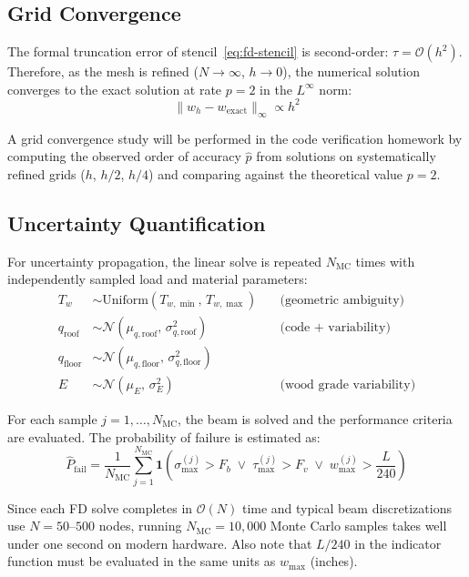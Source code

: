 \subsection{Grid Convergence}

The formal truncation error of stencil~\eqref{eq:fd-stencil} is second-order: $\tau = \mathcal{O}(h^2)$.
Therefore, as the mesh is refined ($N \to \infty$, $h \to 0$), the numerical solution converges to the exact solution at rate $p = 2$ in the $L^\infty$ norm:
\begin{equation}
  \|w_h - w_{\text{exact}}\|_\infty \propto h^2
  \label{eq:convergence}
\end{equation}

A grid convergence study will be performed in the code verification homework by computing the observed order of accuracy $\hat{p}$ from solutions on systematically refined grids ($h$, $h/2$, $h/4$) and comparing against the theoretical value $p = 2$.

\subsection{Uncertainty Quantification}

For uncertainty propagation, the linear solve is repeated $N_{\text{MC}}$ times with independently sampled load and material parameters:
\begin{align}
  T_w &\sim \text{Uniform}(T_{w,\min},\, T_{w,\max}) \quad &\text{(geometric ambiguity)} \\
  q_{\text{roof}} &\sim \mathcal{N}(\mu_{q,\text{roof}},\, \sigma_{q,\text{roof}}^2) \quad &\text{(code + variability)} \\
  q_{\text{floor}} &\sim \mathcal{N}(\mu_{q,\text{floor}},\, \sigma_{q,\text{floor}}^2) \\
  E &\sim \mathcal{N}(\mu_E,\, \sigma_E^2) \quad &\text{(wood grade variability)}
\end{align}

For each sample $j = 1, \ldots, N_{\text{MC}}$, the beam is solved and the performance criteria are evaluated.
The probability of failure is estimated as:
\begin{equation}
  \hat{P}_{\text{fail}} = \frac{1}{N_{\text{MC}}} \sum_{j=1}^{N_{\text{MC}}}
  \mathbf{1}\!\left(\sigma_{\max}^{(j)} > F_b \;\vee\; \tau_{\max}^{(j)} > F_v \;\vee\; w_{\max}^{(j)} > \frac{L}{240}\right)
  \label{eq:pfail}
\end{equation}

Since each FD solve completes in $\mathcal{O}(N)$ time and typical beam discretizations use $N = 50$--$500$ nodes, running $N_{\text{MC}} = 10{,}000$ Monte Carlo samples takes well under one second on modern hardware.
Also note that $L/240$ in the indicator function must be evaluated in the same units as $w_{\max}$ (inches).

